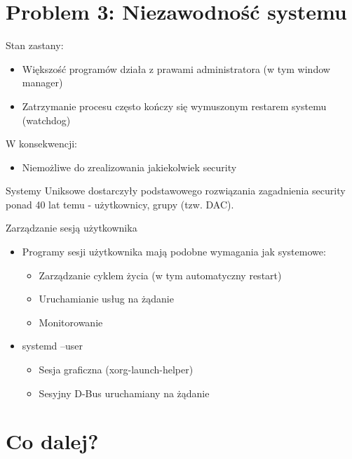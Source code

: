\documentclass[presentation,aspectratio=43,12pt]{beamer}
\begin{document}
\section{Problem 3: Niezawodność systemu}
\label{sec-7}

\begin{frame}[label=sec-7-1]{Stan zastany:}
\begin{itemize}
\item Większość programów działa z prawami administratora (w tym
window manager)

\item Zatrzymanie procesu często kończy się wymuszonym restarem
systemu (watchdog)
\end{itemize}

\pause
W konsekwencji:
\begin{itemize}
\item Niemożliwe do zrealizowania jakiekolwiek security
\end{itemize}

\pause
Systemy Uniksowe dostarczyły podstawowego rozwiązania zagadnienia
security ponad 40 lat temu - użytkownicy, grupy (tzw. DAC).
\end{frame}

\begin{frame}[label=sec-7-2]{Zarządzanie sesją użytkownika}
\begin{itemize}
\item Programy sesji użytkownika mają podobne wymagania jak systemowe:
\begin{itemize}
\item Zarządzanie cyklem życia (w tym automatyczny restart)
\item Uruchamianie usług na żądanie
\item Monitorowanie
\end{itemize}

\item <2-> systemd --user
\begin{itemize}
\item Sesja graficzna (xorg-launch-helper)
\item Sesyjny D-Bus uruchamiany na żądanie
\end{itemize}
\end{itemize}
\end{frame}

\section{Co dalej?}
\label{sec-8}
\end{document}
